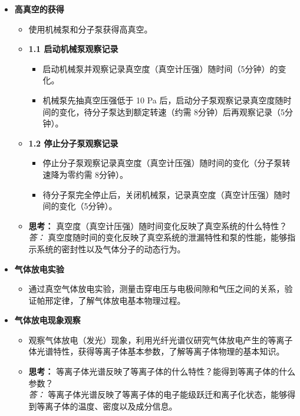 \documentclass[dvipsnames, svgnames,a4paper,11pt]{article}
\begin{document}
\begin{itemize}
    \item \textbf{高真空的获得}
    \begin{itemize}
        \item 使用机械泵和分子泵获得高真空。
        
        \item \textbf{1.1 启动机械泵观察记录}
        \begin{itemize}
            \item 启动机械泵并观察记录真空度（真空计压强）随时间（5分钟）的变化。
            \item 机械泵先抽真空压强低于 10 Pa 后，启动分子泵观察记录真空度随时间的变化，待分子泵达到额定转速（约需 8分钟）后再观察记录（5分钟）。
        \end{itemize}
        
        \item \textbf{1.2 停止分子泵观察记录}
        \begin{itemize}
            \item 停止分子泵观察记录真空度（真空计压强）随时间的变化（分子泵转速降为零约需 8分钟）。
            \item 待分子泵完全停止后，关闭机械泵，记录真空度（真空计压强）随时间的变化（5分钟）。
        \end{itemize}
        
        \item \textbf{思考：} 真空度（真空计压强）随时间变化反映了真空系统的什么特性？\\
        \textit{答：} 真空度随时间的变化反映了真空系统的泄漏特性和泵的性能，能够指示系统的密封性以及气体分子的动态行为。
    \end{itemize}

    \item \textbf{气体放电实验}
    \begin{itemize}
        \item 通过真空气体放电实验，测量击穿电压与电极间隙和气压之间的关系，验证帕邢定律，了解气体放电基本物理过程。
    \end{itemize}

    \item \textbf{气体放电现象观察}
    \begin{itemize}
        \item 观察气体放电（发光）现象，利用光纤光谱仪研究气体放电产生的等离子体光谱特性，获得等离子体基本参数，了解等离子体物理的基本知识。
        
        \item \textbf{思考：} 等离子体光谱反映了等离子体的什么特性？能得到等离子体的什么参数？\\
        \textit{答：} 等离子体光谱反映了等离子体的电子能级跃迁和离子化状态，能够得到等离子体的温度、密度以及成分信息。
    \end{itemize}


\end{itemize}
\end{document}
